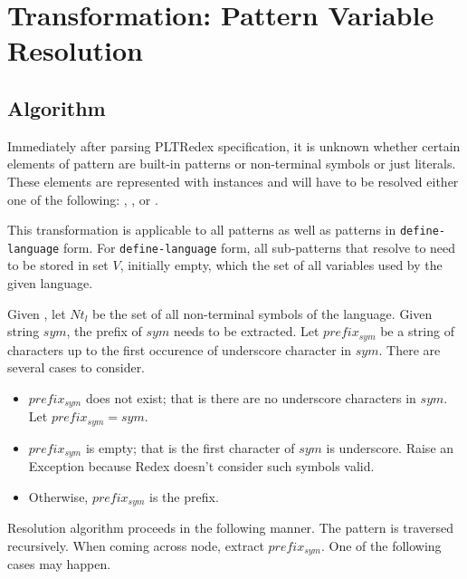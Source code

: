 \section{Transformation: Pattern Variable Resolution}

\subsection{Algorithm}

Immediately after parsing PLTRedex specification, it is unknown whether certain elements of pattern are built-in patterns or non-terminal symbols or just literals. These elements are represented with \UnresolvedSymbol instances and will have to be resolved either one of the following: \BuiltInPatternNoArg, \NonTerminalNoArg, or \LiteralPatternNoArg.

This transformation is applicable to all patterns as well as patterns in \texttt{define-language} form. For \texttt{define-language} form, all sub-patterns that resolve to \LiteralPatternNoArg need to be stored in set $V$, initially empty, which the set of all variables used by the given language.

Given , let $Nt_{l}$ be the set of all non-terminal symbols of the language. Given string $sym$, the prefix of $sym$ needs to be extracted. Let $prefix_{sym}$ be a string of characters up to the first occurence of underscore character in $sym$. There are several cases to consider.

\begin{itemize}
\item $prefix_{sym}$ does not exist; that is there are no underscore characters in $sym$. Let $prefix_{sym}=sym$.
\item $prefix_{sym}$ is empty; that is the first character of $sym$ is underscore. Raise an Exception because Redex doesn't consider such symbols valid.
\item Otherwise, $prefix_{sym}$ is the prefix.
\end{itemize}

Resolution algorithm proceeds in the following manner. The pattern is traversed recursively. When coming across \UnresolvedSymbol node, extract $prefix_{sym}$. One of the following cases may happen.

